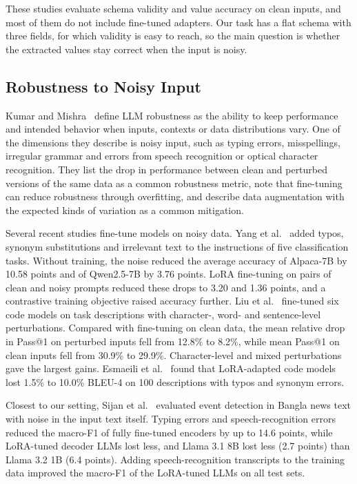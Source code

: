 \documentclass[journal,article,submit,pdftex,moreauthors]{Definitions/mdpi}
\begin{document}
These studies evaluate schema validity and value accuracy on clean inputs, and most of them do not include fine-tuned adapters. Our task has a flat schema with three fields, for which validity is easy to reach, so the main question is whether the extracted values stay correct when the input is noisy.

\subsection{Robustness to Noisy Input}\label{sec:rw-noise}

Kumar and Mishra~\citep{kumar2025robustness} define LLM robustness as the ability to keep performance and intended behavior when inputs, contexts or data distributions vary. One of the dimensions they describe is noisy input, such as typing errors, misspellings, irregular grammar and errors from speech recognition or optical character recognition. They list the drop in performance between clean and perturbed versions of the same data as a common robustness metric, note that fine-tuning can reduce robustness through overfitting, and describe data augmentation with the expected kinds of variation as a common mitigation.

Several recent studies fine-tune models on noisy data. Yang et al.~\citep{yang2026towards} added typos, synonym substitutions and irrelevant text to the instructions of five classification tasks. Without training, the noise reduced the average accuracy of Alpaca-7B by 10.58 points and of Qwen2.5-7B by 3.76 points. LoRA fine-tuning on pairs of clean and noisy prompts reduced these drops to 3.20 and 1.36 points, and a contrastive training objective raised accuracy further. Liu et al.~\citep{liu2026improving} fine-tuned six code models on task descriptions with character-, word- and sentence-level perturbations. Compared with fine-tuning on clean data, the mean relative drop in Pass@1 on perturbed inputs fell from 12.8\% to 8.2\%, while mean Pass@1 on clean inputs fell from 30.9\% to 29.9\%. Character-level and mixed perturbations gave the largest gains. Esmaeili et al.~\citep{esmaeili2026empirical} found that LoRA-adapted code models lost 1.5\% to 10.0\% BLEU-4 on 100 descriptions with typos and synonym errors.

Closest to our setting, Sijan et al.~\citep{sijan2026beyond} evaluated event detection in Bangla news text with noise in the input text itself. Typing errors and speech-recognition errors reduced the macro-F1 of fully fine-tuned encoders by up to 14.6 points, while LoRA-tuned decoder LLMs lost less, and Llama 3.1 8B lost less (2.7 points) than Llama 3.2 1B (6.4 points). Adding speech-recognition transcripts to the training data improved the macro-F1 of the LoRA-tuned LLMs on all test sets.
\end{document}
